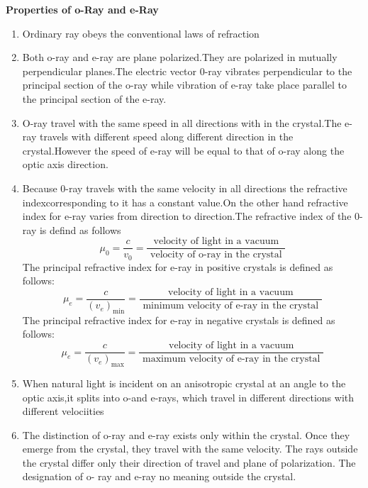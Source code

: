   \textbf{Properties of o-Ray and e-Ray}
  \begin{enumerate}
  	\item Ordinary ray obeys the conventional laws of refraction
  	\item Both o-ray and e-ray are plane polarized.They are polarized in mutually perpendicular planes.The electric vector 0-ray vibrates perpendicular to the principal section of the o-ray while vibration of e-ray take place parallel to the principal section of the e-ray.
  	\item O-ray travel with the same speed in all directions with in the crystal.The e-ray travels with different speed along different direction in the crystal.However the speed of e-ray will be equal to that of o-ray along the optic axis direction.
  	\item Because 0-ray travels with the same velocity in all directions the refractive indexcorresponding to it has a constant value.On the other hand refractive index for e-ray varies from direction to direction.The refractive index of the 0-ray is defind as follows\\
  	$$\mu_{0}=\frac{c}{v_{0}}=\frac{\text { velocity of light in a vacuum }}{\text { velocity of o-ray in the crystal }}$$
  	The principal refractive index for e-ray in positive crystals is defined as follows:
  	$$
  	\mu_{e}=\frac{c}{\left(v_{e}\right)_{\min }}=\frac{\text { velocity of light in a vacuum }}{\text { minimum velocity of e-ray in the crystal }}
  	$$
  	The principal refractive index for e-ray in negative crystals is defined as follows:
  	$$
  	\mu_{e}=\frac{c}{\left(v_{e}\right)_{\max }}=\frac{\text { velocity of light in a vacuum }}{\text { maximum velocity of e-ray in the crystal }}
  	$$
  	\item When natural light is incident on an anisotropic crystal at an angle to the optic axis,it splits into o-and e-rays, which travel in different directions with different velociities
  	\item The distinction of o-ray and e-ray exists only within the crystal. Once they emerge from the crystal, they travel with the same velocity. The rays outside the crystal differ only their direction of travel and plane of polarization. The designation of o- ray and e-ray no meaning outside the crystal.
  \end{enumerate}
